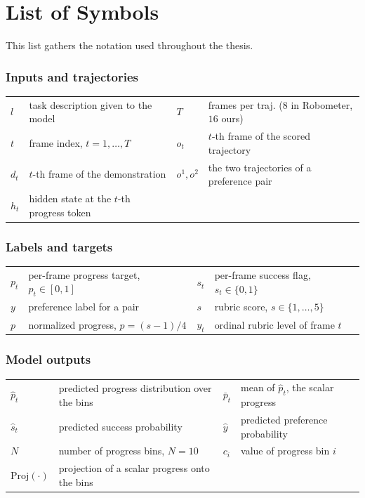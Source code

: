 \chapter{List of Symbols}
This list gathers the notation used throughout the thesis.

\subsection*{Inputs and trajectories}
\begin{tabular}{@{}p{1.9cm}p{6.0cm}p{1.9cm}p{6.0cm}@{}}
$l$ & task description given to the model & $T$ & frames per traj. ($8$ in Robometer, $16$ ours) \\
$t$ & frame index, $t=1,\dots,T$ & $o_t$ & $t$-th frame of the scored trajectory \\
$d_t$ & $t$-th frame of the demonstration & $o^1,o^2$ & the two trajectories of a preference pair \\
$h_t$ & hidden state at the $t$-th progress token & & \\
\end{tabular}

\subsection*{Labels and targets}
\begin{tabular}{@{}p{1.9cm}p{6.0cm}p{1.9cm}p{6.0cm}@{}}
$p_t$ & per-frame progress target, $p_t\in[0,1]$ & $s_t$ & per-frame success flag, $s_t\in\{0,1\}$ \\
$y$ & preference label for a pair & $s$ & rubric score, $s\in\{1,\dots,5\}$ \\
$p$ & normalized progress, $p=(s-1)/4$ & $y_t$ & ordinal rubric level of frame $t$ \\
\end{tabular}

\subsection*{Model outputs}
\begin{tabular}{@{}p{1.9cm}p{6.0cm}p{1.9cm}p{6.0cm}@{}}
$\hat{p}_t$ & predicted progress distribution over the bins & $\bar{p}_t$ & mean of $\hat{p}_t$, the scalar progress \\
$\hat{s}_t$ & predicted success probability & $\hat{y}$ & predicted preference probability \\
$N$ & number of progress bins, $N=10$ & $c_i$ & value of progress bin $i$ \\
$\mathrm{Proj}(\cdot)$ & projection of a scalar progress onto the bins & & \\
\end{tabular}

